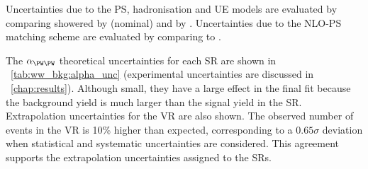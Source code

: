 Uncertainties due to the PS, hadronisation and UE models are evaluated by 
comparing \powhegbox showered by  (nominal) and by \fherwig. 
Uncertainties due to the NLO-PS matching scheme are evaluated by comparing 
\meps{\powhegbox}{\fherwig} to \meps{\amcatnlo}{\fherwig}.

The $\alpha_{\WW}$ theoretical uncertainties for each SR are shown in 
\Table~\ref{tab:ww_bkg:alpha_unc} (experimental uncertainties are discussed in 
\Chapter~\ref{chap:results}). Although small, they have a large effect in the final fit 
because the \WW background yield is much larger than the signal yield in the SR. 
Extrapolation uncertainties for the VR are also shown. The observed number of events in the 
\WW VR is 10\% higher than expected, corresponding to a $0.65\sigma$ deviation when 
statistical and systematic uncertainties are considered. This agreement supports the 
extrapolation uncertainties assigned to the SRs.

